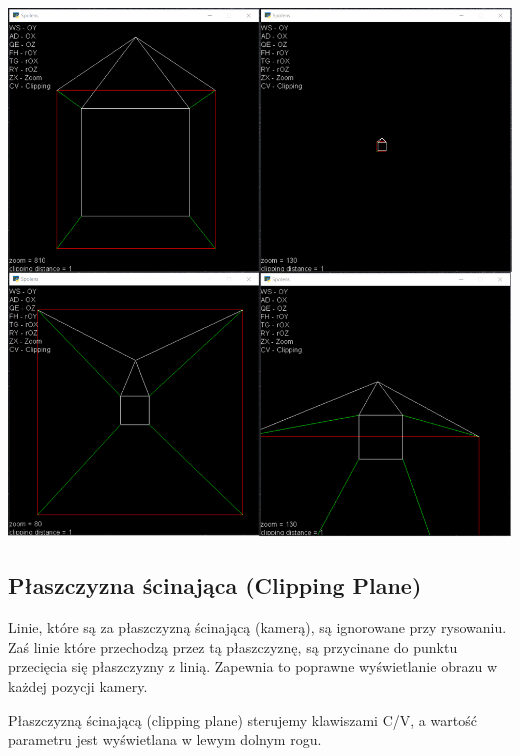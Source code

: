 \documentclass[12pt]{article}
\begin{document}
\begin{center}
    \noindent\includegraphics[scale=0.5]{spolens zoom.png}
\end{center}

\newpage
\subsection{Płaszczyzna ścinająca (Clipping Plane)}
Linie, które są za płaszczyzną ścinającą (kamerą), są ignorowane przy rysowaniu. Zaś linie które przechodzą przez tą płaszczyznę, są przycinane do punktu przecięcia się płaszczyzny z linią. Zapewnia to poprawne wyświetlanie obrazu w każdej pozycji kamery.

Płaszczyzną ścinającą (clipping plane) sterujemy klawiszami C/V, a wartość parametru jest wyświetlana w lewym dolnym rogu.
\end{document}

